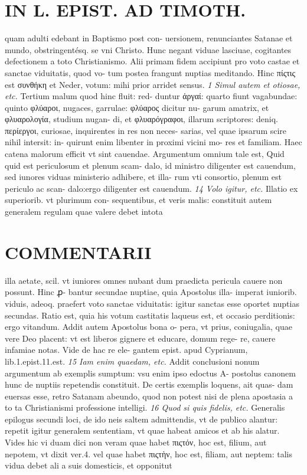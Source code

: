 \documentclass{article}
\begin{document}
\begin{pages}
\section*{IN L. EPIST. AD TIMOTH. }
\marginpar{[ p.129 ]}\pstart quam adulti edebant in Baptismo post con- uersionem, renunciantes Satanae et mundo, obstringentésq. se vni Christo. Hunc negant viduae lasciuae, cogitantes defectionem a toto Christianismo. Alii primam fidem accipiunt pro voto castae et sanctae viduitatis, quod vo- tum postea frangunt nuptias meditando. Hinc πίςτις est συνθήκη et Neder, votum: mihi prior arridet sensus.  \pend
\textit{1 Simul autem et otiosae, etc. }\pstart Tertium malum quod hinc fluit: red- duntur ἀργαί: quarto fiunt vagabundae: quinto φλύαροι, nugaces, garrulae: φλύαρος dicitur nu- garum amatrix, et φλυαρολογία, studium nugan- di, et φλυαρόγραφοι, illarum scriptores: deniq. περίεργοι, curiosae, inquirentes in res non neces- sarias, vel quae ipsarum scire nihil intersit: in- quirunt enim libenter in proximi vicini mo- res et familiam. Haec catena malorum efficit vt sint cauendae. Argumentum omnium tale est, Quid quid est periculosum et plenum scam- dalo, id ministro diligenter est cauendum, sed iunores viduas ministerio adhibere, et illa- rum vti consortio, plenum est periculo ac scan- dalo:ergo diligenter est cauendum.  \pend
\textit{14 Volo igitur, etc. }\pstart Illatio ex superiorib. vt plurimum con- sequentibus, et veris malis: constituit autem generalem regulam quae valere debet intota  \pend
\section*{COMMENTARII }
\marginpar{[ p.130 ]}\pstart illa aetate, scil. vt iuniores omnes nubant dum praedicta pericula cauere non possunt. Hinc ꝓ- bantur secundae nuptiae, quia Apostolus illa- imperat iuniorib. viduis, adeoq. praefert voto sanctae viduitatis: igitur sanctas esse oportet nuptias secundas. Ratio est, quia his votum castitatis laqueus est, et occasio perditionis: ergo vitandum. Addit autem Apostolus bona o- pera, vt prius, coniugalia, quae vere Deo placent: vt est liberos gignere et educare, domum rege- re, cauere infamiae notas. Vide de hac re ele- gantem epist. apud Cyprianum, lib.1.epist.11.est.  \pend
\textit{15 Iam enim quaedam, etc. }\pstart Addit conclusioni nonum argumentum ab exemplis sumptum: vsu enim ipso edoctus A- postolus canonem hunc de nuptiis repetendis constituit. De certis exemplis loquens, ait quas- dam euersas esse, retro Satanam abeundo, quod non potest nisi de plena apostasia a to ta Christianismi professione intelligi.  \pend
\textit{16 Quod si quis fidelis, etc. }\pstart Generalis epilogus secundi loci, de ido neis saltem admittendis, vt de publico alantur: repetit igitur generalem sententiam, vt quae habeat amicos et ab his alatur. Vides hic vi duam dici non veram quae habet πιςτόν, hoc est, filium, aut nepotem, vt dixit ver.4. vel quae habet πιςτὴν, hoc est, filiam, aut neptem: talis vidua debet ali a suis domesticis, et opponitut  \pend

\end{pages}
\end{document}
